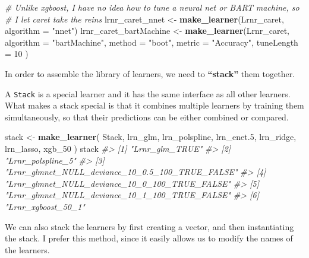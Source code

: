 \documentclass[12pt, krantz2,]{book}
\newenvironment{Shaded}{\begin{snugshade}}{\end{snugshade}}
\newcommand{\CommentTok}[1]{\textcolor[rgb]{0.56,0.35,0.01}{\textit{#1}}}
\newcommand{\DataTypeTok}[1]{\textcolor[rgb]{0.13,0.29,0.53}{#1}}
\newcommand{\DecValTok}[1]{\textcolor[rgb]{0.00,0.00,0.81}{#1}}
\newcommand{\FloatTok}[1]{\textcolor[rgb]{0.00,0.00,0.81}{#1}}
\newcommand{\KeywordTok}[1]{\textcolor[rgb]{0.13,0.29,0.53}{\textbf{#1}}}
\newcommand{\NormalTok}[1]{#1}
\newcommand{\StringTok}[1]{\textcolor[rgb]{0.31,0.60,0.02}{#1}}
\theoremstyle{definition}
\theoremstyle{definition}
\theoremstyle{definition}
\newcommand{\1}{\mathbbm{1}}
\begin{document}
\begin{Shaded}
\begin{Highlighting}[]
\CommentTok{# Unlike xgboost, I have no idea how to tune a neural net or BART machine, so}
\CommentTok{# I let caret take the reins}
\NormalTok{lrnr_caret_nnet <-}\StringTok{ }\KeywordTok{make_learner}\NormalTok{(Lrnr_caret, }\DataTypeTok{algorithm =} \StringTok{"nnet"}\NormalTok{)}
\NormalTok{lrnr_caret_bartMachine <-}\StringTok{ }\KeywordTok{make_learner}\NormalTok{(Lrnr_caret,}
  \DataTypeTok{algorithm =} \StringTok{"bartMachine"}\NormalTok{,}
  \DataTypeTok{method =} \StringTok{"boot"}\NormalTok{, }\DataTypeTok{metric =} \StringTok{"Accuracy"}\NormalTok{,}
  \DataTypeTok{tuneLength =} \DecValTok{10}
\NormalTok{)}
\end{Highlighting}
\end{Shaded}

In order to assemble the library of learners, we need to \textbf{``stack''} them
together.

A \texttt{Stack} is a special learner and it has the same interface as all other
learners. What makes a stack special is that it combines multiple learners by
training them simultaneously, so that their predictions can be either combined
or compared.

\begin{Shaded}
\begin{Highlighting}[]
\NormalTok{stack <-}\StringTok{ }\KeywordTok{make_learner}\NormalTok{(}
\NormalTok{  Stack, lrn_glm, lrn_polspline, lrn_enet}\FloatTok{.5}\NormalTok{, lrn_ridge, lrn_lasso, xgb_}\DecValTok{50}
\NormalTok{)}
\NormalTok{stack}
\CommentTok{#> [1] "Lrnr_glm_TRUE"                                  }
\CommentTok{#> [2] "Lrnr_polspline_5"                               }
\CommentTok{#> [3] "Lrnr_glmnet_NULL_deviance_10_0.5_100_TRUE_FALSE"}
\CommentTok{#> [4] "Lrnr_glmnet_NULL_deviance_10_0_100_TRUE_FALSE"  }
\CommentTok{#> [5] "Lrnr_glmnet_NULL_deviance_10_1_100_TRUE_FALSE"  }
\CommentTok{#> [6] "Lrnr_xgboost_50_1"}
\end{Highlighting}
\end{Shaded}

We can also stack the learners by first creating a vector, and then
instantiating the stack. I prefer this method, since it easily allows us to
modify the names of the learners.
\end{document}
